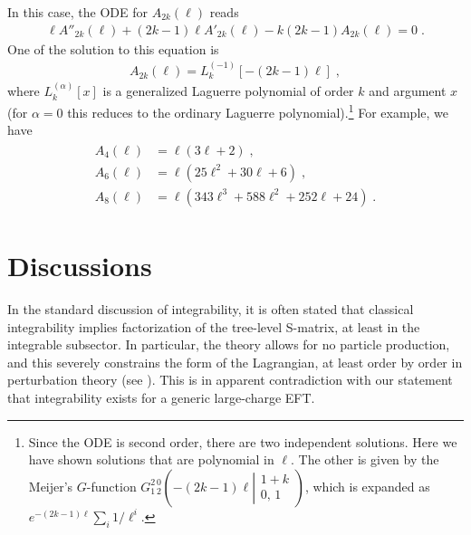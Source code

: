 \documentclass[12pt]{article}
\begin{document}
In this case, the ODE for $A_{2k}(\ell)$ reads 
\begin{align}
\ell A''_{2k}(\ell) + (2k-1) \ell A'_{2k}(\ell) - k(2k-1) A_{2k}(\ell) = 0 \;.
\end{align}
One of the solution to this equation is
\begin{align}
A_{2k}(\ell) = L_k^{(-1)} [ -(2k-1) \ell ]\;,
\end{align}
where $L_k^{(\alpha)}[x]$ is a generalized Laguerre polynomial of order $k$ and argument $x$ (for $\alpha=0$ this reduces to the ordinary Laguerre polynomial).\footnote{Since the ODE is second order, there are two independent solutions. Here we have shown solutions that are polynomial in $\ell$. The other is given by the Meijer's $G$-function $G_{1\,2}^{2\, 0}\left(-(2k-1)\ell\left|\begin{matrix}
    1+k\\
    0,\, 1
\end{matrix}\right.\right)$, which is expanded as $\textstyle e^{-(2k-1)\ell}\sum_i 1/\ell^i$.}
For example, we have
\begin{align}
\begin{split}
A_4(\ell)& = \ell (3\ell+2)\;, \\
A_6(\ell)& = \ell (25\ell^2 + 30 \ell+6) \;,\\
A_8(\ell)& = \ell (343\ell^3 + 588\ell^2+252\ell+24) \;.
\end{split}
\end{align}

\section{Discussions}\label{sec:Discussion}


In the standard discussion of integrability, it is often stated that classical integrability implies
factorization of the tree-level S-matrix, at least in 
 the integrable subsector. In particular, the theory allows for 
no particle production, and this severely constrains the form of the Lagrangian, 
at least order by order in perturbation theory (see \cite{Shankar:1977cm,Zamolodchikov:1978xm,Parke:1980ki,Dorey:1996gd}).
This is in apparent contradiction with our statement that
integrability exists for a generic large-charge EFT.
\end{document}
